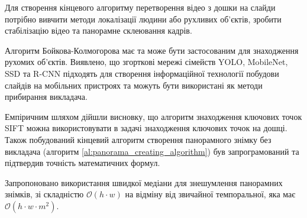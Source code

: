 \chapterConclusion

Для створення кінцевого алгоритму перетворення відео з дошки на слайди 
потрібно вивчити методи локалізації людини або рухливих об'єктів,
зробити стабілізацію відео та панорамне склеювання кадрів.


Алгоритм Бойкова-Колмогорова має та може бути застосованим для знаходження
рухомих об'єктів.
Виявлено, що згорткові мережі сімейств YOLO, MobileNet, SSD та R-CNN 
підходять для створення інформаційної технології побудови слайдів на
мобільних пристроях та можуть бути використані як методи прибирання викладача.


Емпіричним шляхом дійшли висновку, що алгоритм знаходження ключових точок SIFT можна використовувати 
в задачі знаходження ключових точок на дошці. Також побудований кінцевий алгоритм створення
панорамного знімку без викладача (алгоритм \ref{al:panorama_creating_algorithm}) був запрограмований та 
підтвердив точність математичних формул.


Запропоновано використання швидкої медіани для знешумлення панорамних знімків, 
зі складністю $\mathcal{O}(h \cdot w)$ на відміну від звичайної темпоральної,
яка має $\mathcal{O}(h \cdot w \cdot m^2)$.
